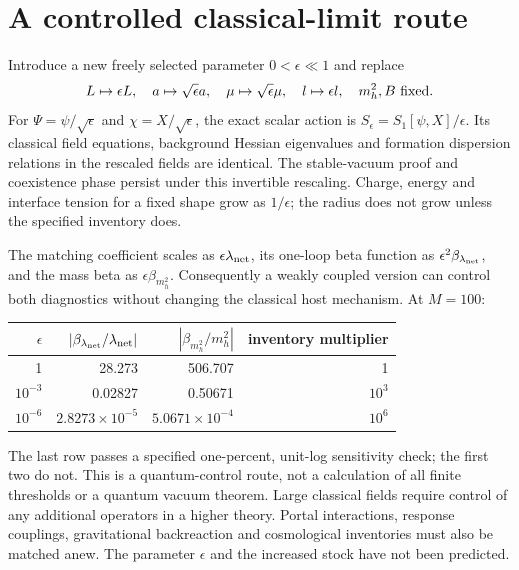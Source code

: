 \documentclass[11pt]{article}
\begin{document}
\section{A controlled classical-limit route}
Introduce a new freely selected parameter $0<\epsilon\ll1$ and replace
\begin{equation}
 L\mapsto\epsilon L,\quad a\mapsto\sqrt\epsilon a,\quad
 \mu\mapsto\sqrt\epsilon\mu,\quad l\mapsto\epsilon l,
 \quad m_h^2,B\ \hbox{fixed}.
\end{equation}
For $\Psi=\psi/\sqrt\epsilon$ and $\chi=X/\sqrt\epsilon$, the exact
scalar action is $S_\epsilon=S_1[\psi,X]/\epsilon$.
Its classical field equations, background Hessian eigenvalues and
formation dispersion relations in the rescaled fields are identical.
The stable-vacuum proof and coexistence phase persist under this invertible
rescaling. Charge, energy and interface tension for a fixed shape grow as
$1/\epsilon$; the radius does not grow unless the specified inventory does.

The matching coefficient scales as $\epsilon\lambda_{\rm net}$,
its one-loop beta function as $\epsilon^2\beta_{\lambda_{\rm net}}$,
and the mass beta as $\epsilon\beta_{m_h^2}$. Consequently a weakly coupled
version can control both diagnostics without changing the classical
host mechanism. At $M=100$:
\begin{center}
\begin{tabular}{rrrr}
\toprule
$\epsilon$ & $|\beta_{\lambda_{\rm net}}/\lambda_{\rm net}|$
 & $|\beta_{m_h^2}/m_h^2|$ & inventory multiplier\\
\midrule
1 & 28.273 & 506.707 & 1\\
$10^{-3}$ & 0.02827 & 0.50671 & $10^3$\\
$10^{-6}$ & $2.8273\times10^{-5}$ & $5.0671\times10^{-4}$ & $10^6$\\
\bottomrule
\end{tabular}
\end{center}
The last row passes a specified one-percent, unit-log sensitivity check;
the first two do not. This is a quantum-control route, not a calculation
of all finite thresholds or a quantum vacuum theorem. Large classical
fields require control of any additional operators in a higher theory.
Portal interactions, response couplings, gravitational backreaction and
cosmological inventories must also be matched anew. The parameter
$\epsilon$ and the increased stock have not been predicted.
\end{document}
